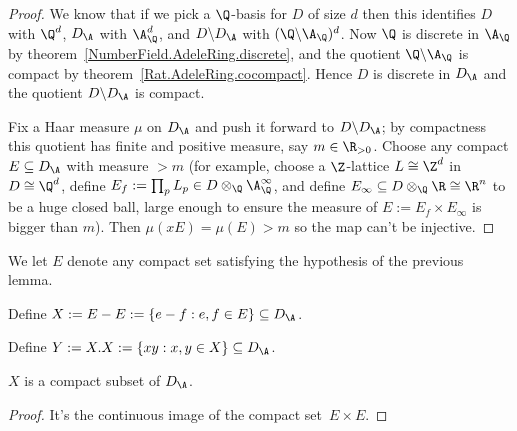 \begin{proof}
  \leanok
  We know that if we pick a $\Q$-basis for $D$
  of size $d$ then this identifies $D$ with $\Q^d$,
  $D_{\A}$ with $\A_{\Q}^d$, and $D\backslash D_{\A}$ with
  $(\Q\backslash\A_{\Q})^d$. Now $\Q$ is discrete in $\A_{\Q}$
  by theorem~\ref{NumberField.AdeleRing.discrete}, and the quotient
  $\Q\backslash \A_{\Q}$ is compact by theorem~\ref{Rat.AdeleRing.cocompact}.
  Hence $D$ is discrete in $D_{\A}$
  and the quotient $D\backslash D_{\A}$ is compact.

    Fix a Haar measure $\mu$ on $D_{\A}$ and push it forward
    to $D\backslash D_{\A}$; by compactness this quotient has finite
    and positive measure, say $m\in\R_{>0}$.
    Choose any compact $E\subseteq D_{\A}$ with measure $> m$
    (for example, choose a $\Z$-lattice $L\cong\Z^d$ in $D\cong\Q^d$,
    define $E_f:=\prod_p L_p\in D\otimes_{\Q}\A_{\Q}^\infty$,
    and define $E_{\infty}\subseteq D\otimes_{\Q}\R\cong\R^n$ to be a huge closed
    ball, large enough to ensure the measure of $E:=E_f\times E_{\infty}$ is bigger than $m$).
    Then $\mu(xE)=\mu(E)>m$ so the map can't be injective.
\end{proof}

\begin{definition}
  \label{NumberField.AdeleRing.DivisionAlgebra.Aux.E}
  \leanok
  We let $E$ denote any compact set satisfying the hypothesis of the previous lemma.
\end{definition}

\begin{definition}
  \label{NumberField.AdeleRing.DivisionAlgebra.Aux.X}
  \leanok
Define $X:=E-E:=\{e-f:e,f\in E\}\subseteq D_{\A}$.
\end{definition}

\begin{definition}
  \label{NumberField.AdeleRing.DivisionAlgebra.Aux.Y}
  \leanok
Define $Y:=X.X:=\{xy:x,y\in X\}\subseteq D_{\A}$.
\end{definition}

\begin{lemma}
  \label{NumberField.AdeleRing.DivisionAlgebra.Aux.X_compact}
  \leanok
  $X$ is a compact subset of $D_{\A}$.
\end{lemma}
\begin{proof}
  \leanok
  It's the continuous image of the compact set~$E\times E$.
\end{proof}

